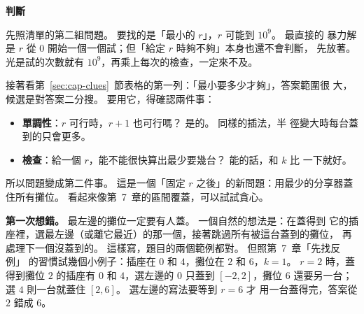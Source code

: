 \begin{center}
\label{fig:cap-router}
\end{center}

\textbf{判斷}

先照清單的第二組問題。 要找的是「最小的 $r$」，$r$ 可能到 $10^9$。 最直接的
暴力解是 $r$ 從 $0$ 開始一個一個試；但「給定 $r$ 時夠不夠」本身也還不會判斷，
先放著。 光是試的次數就有 $10^9$，再乘上每次的檢查，一定來不及。

接著看第~\ref{sec:cap-clues}~節表格的第一列：「最小要多少才夠」，答案範圍很
大，候選是對答案二分搜。 要用它，得確認兩件事：

\begin{itemize}
\item \textbf{單調性}：$r$ 可行時，$r + 1$ 也可行嗎？ 是的。 同樣的插法，半
徑變大時每台蓋到的只會更多。
\item \textbf{檢查}：給一個 $r$，能不能很快算出最少要幾台？ 能的話，和 $k$ 比
一下就好。
\end{itemize}

所以問題變成第二件事。 這是一個「固定 $r$ 之後」的新問題：用最少的分享器蓋
住所有攤位。 看起來像第~7~章的區間覆蓋，可以試試貪心。

\textbf{第一次想錯。} 最左邊的攤位一定要有人蓋。 一個自然的想法是：在蓋得到
它的插座裡，選最左邊（或離它最近）的那一個，接著跳過所有被這台蓋到的攤位，
再處理下一個沒蓋到的。 這樣寫，題目的兩個範例都對。 但照第~7~章「先找反例」
的習慣試幾個小例子：插座在 $0$ 和 $4$，攤位在 $2$ 和 $6$，$k = 1$。 $r = 2$
時，蓋得到攤位 $2$ 的插座有 $0$ 和 $4$，選左邊的 $0$ 只蓋到 $[-2, 2]$，攤位
$6$ 還要另一台；選 $4$ 則一台就蓋住 $[2, 6]$。 選左邊的寫法要等到 $r = 6$ 才
用一台蓋得完，答案從 $2$ 錯成 $6$。

